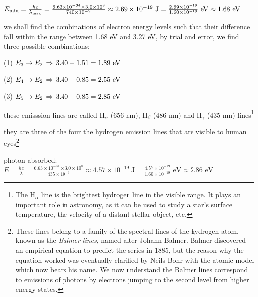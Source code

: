\eqskip $E_{\text{min}} = \frac{hc}{\lambda_{\text{max}}} = \frac{6.63\times10^{-34}\times 3.0 \times10^8}{740\times10^{-9}} \approx 2.69\times10^{-19} \text{ J} = \frac{2.69\times10^{-19}}{1.60\times10^{-19}} \text{ eV} \approx 1.68 \text{ eV}$

we shall find the combinations of electron energy levels such that their difference fall within the range between 1.68 eV and 3.27 eV, by trial and error, we find three possible combinations:

\begin{compactenum}
	\item[(1)] $E_3 \to E_2 \, \Rightarrow \, 3.40 - 1.51 = 1.89 \text{ eV}$
	
	\item[(2)] $E_4 \to E_2 \, \Rightarrow \, 3.40 - 0.85 = 2.55 \text{ eV}$
	
	\item[(3)] $E_5 \to E_2 \, \Rightarrow \, 3.40 - 0.85 = 2.85 \text{ eV}$
\end{compactenum}

these emisssion lines are called H$_\alpha$ (656 nm), H$_\beta$ (486 nm) and H$_\gamma$ (435 nm) lines\footnote{The H$_\alpha$ line is the brightest hydrogen line in the visible range. It plays an important role in astronomy, as it can be used to study a star's surface temperature, the velocity of a distant stellar object, etc.}

they are three of the four the hydrogen emission lines that are visible to human eyes\footnote{These lines belong to a family of the spectral lines of the hydrogen atom, known as the \emph{Balmer lines}, named after Johann Balmer. Balmer discovered an empirical equation to predict the series in 1885, but the reason why the equation worked was eventually clarified by Neils Bohr with the atomic model which now bears his name. We now understand the Balmer lines correspond to emissions of photons by electrons jumping to the second level from higher energy states.} \eoe




\sol photon absorbed: $E = \frac{hc}{\lambda} = \frac{6.63\times10^{-34}\times 3.0 \times10^8}{435\times10^{-9}} \approx 4.57\times10^{-19} \text{ J} = \frac{4.57\times10^{-19}}{1.60\times10^{-19}} \text{ eV} \approx 2.86 \text{ eV}$

